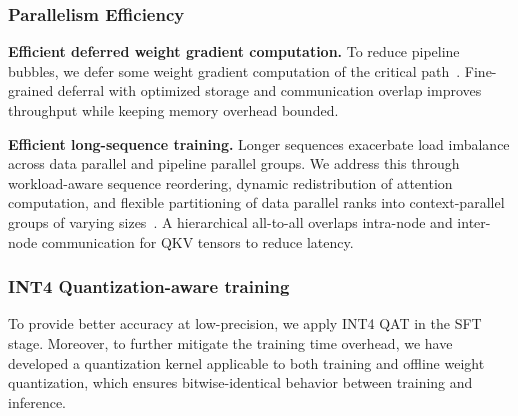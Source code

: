 \subsubsection{Parallelism Efficiency}

\textbf{Efficient deferred weight gradient computation.} To reduce pipeline bubbles, we defer some weight gradient computation of the critical path~\cite{qi2023zero}. Fine-grained deferral with optimized storage and communication overlap improves throughput while keeping memory overhead bounded.

\textbf{Efficient long-sequence training.} Longer sequences exacerbate load imbalance across data parallel and pipeline parallel groups. We address this through workload-aware sequence reordering, dynamic redistribution of attention computation, and flexible partitioning of data parallel ranks into context-parallel groups of varying sizes~\cite{ge2025bytescale,wang2025flexsp}. A hierarchical all-to-all overlaps intra-node and inter-node communication for QKV tensors to reduce latency.

\subsubsection{INT4 Quantization-aware training}

To provide better accuracy at low-precision, we apply INT4 QAT in the SFT stage. Moreover, to further mitigate the training time overhead, we have developed a quantization kernel applicable to both training and offline weight quantization, which ensures bitwise-identical behavior between training and inference.
